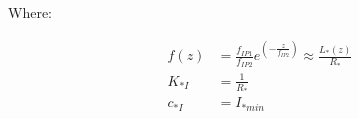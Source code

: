 Where:

\begin{equation}
    \begin{aligned}
        f(z)   & = \frac{f_{IP1}}{f_{IP2}} e^{\left(-\frac{z}{f_{IP2}}\right)} \approx \frac{L_*(z)}{R_*} \\
        K_{*I} & = \frac{1}{R_*}                                                                          \\
        c_{*I} & = I_{*min}
    \end{aligned}
    \label{eq:equations_of_motion_simplified_additional}
\end{equation}